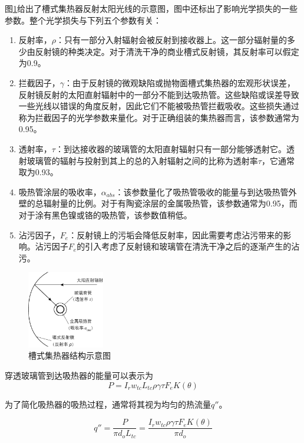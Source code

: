 图\ref{fig:ParabolicTrough}给出了槽式集热器反射太阳光线的示意图，图中还标出了影响光学损失的一些参数。整个光学损失与下列五个参数有关：

\begin{enumerate}[label=(\arabic*)]
  \item 反射率，$\rho$：只有一部分入射辐射会被反射到接收器上。这一部分辐射量的多少由反射镜的种类决定。对于清洗干净的商业槽式反射镜，其反射率可以假定为0.9。
  \item 拦截因子，$\gamma$：由于反射镜的微观缺陷或抛物面槽式集热器的宏观形状误差，反射镜反射的太阳直射辐射中的一部分不能到达吸热管。这些缺陷或误差导致一些光线以错误的角度反射，因此它们不能被吸热管拦截吸收。这些损失通过称为拦截因子的光学参数来量化。对于正确组装的集热器而言，该参数通常为0.95。
  \item 透射率，$\tau$：到达接收器的玻璃管的太阳直射辐射只有一部分能够透射它。透射玻璃管的辐射与投射到其上的总的入射辐射之间的比称为透射率$\tau$，它通常取为0.93。
  \item 吸热管涂层的吸收率，$\alpha_{abs}$：该参数量化了吸热管吸收的能量与到达吸热管外壁的总辐射量的比例。对于有陶瓷涂层的金属吸热管，该参数通常为0.95，而对于涂有黑色镍或铬的吸热管，该参数值稍低。
  \item 沾污因子，$F_e$：反射镜上的污垢会降低反射率，因此需要考虑沾污带来的影响。沾污因子$F_e$的引入考虑了反射镜和玻璃管在清洗干净之后的逐渐产生的沾污。
\end{enumerate}

\begin{figure}[!ht]
\centering
\includegraphics[width=0.3\textwidth]{fig/ParametersOfParabolicDish.pdf}
\caption{槽式集热器结构示意图}\label{fig:ParabolicTrough}
\end{figure}

穿透玻璃管到达吸热器的能量可以表示为
\begin{equation}
  P = I_r w_{tc} L_{tc} \rho \gamma \tau F_e K(\theta)
\end{equation}

为了简化吸热器的吸热过程，通常将其视为均匀的热流量$q''$。

\begin{equation}
  q''= \frac{P}{\pi d_o L_{tc}} = \frac{I_r w_{tc} \rho \gamma \tau F_e K(\theta)}{\pi d_o}
\end{equation}

